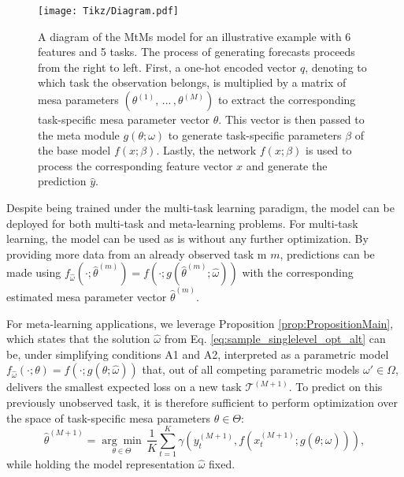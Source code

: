 \documentclass[3p,times,twocolumn]{elsarticle}
\begin{document}
\begin{figure*}[!htbp]
    \centering
    \texttt{[image: Tikz/Diagram.pdf]}
    \caption{
        A diagram of the MtMs model for an illustrative example with 6 features and 5 tasks.
        The process of generating forecasts proceeds from the right to left. 
        First, a one-hot encoded vector $q$, denoting to which task the observation belongs, is multiplied by a matrix of mesa parameters $(\theta^{(1)},\,...\,,\theta^{(M)})$ to extract the corresponding task-specific mesa parameter vector $\theta$.
        This vector is then passed to the meta module $g(\theta; \omega)$ to generate task-specific parameters $\beta$ of the base model $f(x;\beta)$.
        Lastly, the network $f(x;\beta)$ is used to process the corresponding feature vector $x$ and generate the prediction $\hat{y}$.
    }
    \label{fig:Diagram}
\end{figure*}

Despite being trained under the multi-task learning paradigm, the model can be deployed for both multi-task and meta-learning problems.
For multi-task learning, the model can be used as is without any further optimization.
By providing more data from an already observed task m $m$, predictions can be made using $f_{\hat{\omega}}(\cdot;\hat{\theta}^{(m)})=f(\cdot;g(\hat{\theta}^{(m)};\hat{\omega}))$ with the corresponding estimated mesa parameter vector $\hat{\theta}^{(m)}$.

For meta-learning applications, we leverage Proposition \ref{prop:PropositionMain}, which states that the solution $\hat{\omega}$ from Eq. \ref{eq:sample_singlelevel_opt_alt} can be, under simplifying conditions A1 and A2, interpreted as a parametric model $f_{\hat{\omega}}(\cdot;\theta)=f(\cdot;g(\theta;\hat{\omega}))$ that, out of all competing parametric models $\omega' \in \Omega$, delivers the smallest expected loss on a new task $\mathcal{T}^{(M+1)}$.
To predict on this previously unobserved task, it is therefore sufficient to perform optimization over the space of task-specific mesa parameters $\theta \in \Theta$:
\begin{equation}
    \hat{\theta}^{(M+1)} =  \underset{\theta \in \Theta}{\arg\min} \,\dfrac{1}{K}\sum_{t=1}^{K} \gamma( y_{t}^{(M+1)}, f(x_{t}^{(M+1)};g(\theta;\hat{\omega}))),
\end{equation}
while holding the model representation $\hat{\omega}$ fixed.
\end{document}
